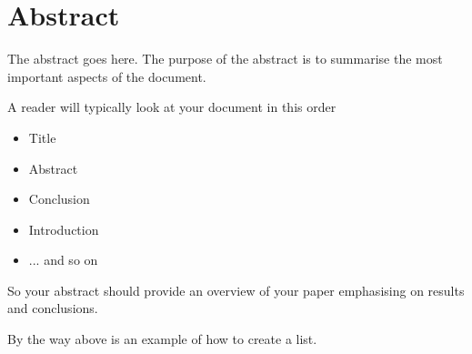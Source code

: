 

\section*{Abstract}

The abstract goes here. The purpose of the abstract is to summarise the most important aspects of the document.

A reader will typically look at your document in this order

\begin{itemize}
\item Title

\item Abstract

\item Conclusion

\item Introduction

\item ... and so on
\end{itemize}


So your abstract should provide an overview of your paper emphasising on results and conclusions.


By the way above is an example of how to create a list.

